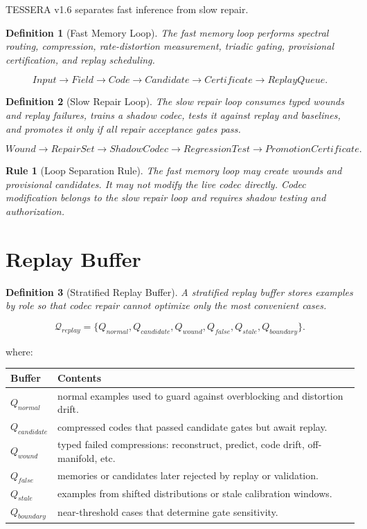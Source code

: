 \documentclass[12pt]{article}
\newtheorem{definition}{Definition}
\newtheorem{rulebox}{Rule}
\begin{document}
TESSERA v1.6 separates fast inference from slow repair.

\begin{definition}[Fast Memory Loop]
The fast memory loop performs spectral routing, compression, rate-distortion
measurement, triadic gating, provisional certification, and replay scheduling.
\end{definition}

\[
Input\rightarrow Field\rightarrow Code\rightarrow Candidate\rightarrow Certificate\rightarrow ReplayQueue.
\]

\begin{definition}[Slow Repair Loop]
The slow repair loop consumes typed wounds and replay failures, trains a shadow
codec, tests it against replay and baselines, and promotes it only if all repair
acceptance gates pass.
\end{definition}

\[
Wound\rightarrow RepairSet\rightarrow ShadowCodec\rightarrow RegressionTest\rightarrow PromotionCertificate.
\]

\begin{rulebox}[Loop Separation Rule]
The fast memory loop may create wounds and provisional candidates. It may not
modify the live codec directly. Codec modification belongs to the slow repair
loop and requires shadow testing and authorization.
\end{rulebox}

\section{Replay Buffer}

\begin{definition}[Stratified Replay Buffer]
A stratified replay buffer stores examples by role so that codec repair cannot
optimize only the most convenient cases.
\end{definition}

\[
\mathcal{Q}_{replay}=\{Q_{normal},Q_{candidate},Q_{wound},Q_{false},Q_{stale},Q_{boundary}\}.
\]

where:

\begin{longtable}{p{}p{}}
\toprule
\textbf{Buffer} & \textbf{Contents} \\
\midrule
$Q_{normal}$ & normal examples used to guard against overblocking and distortion drift. \\
$Q_{candidate}$ & compressed codes that passed candidate gates but await replay. \\
$Q_{wound}$ & typed failed compressions: reconstruct, predict, code drift, off-manifold, etc. \\
$Q_{false}$ & memories or candidates later rejected by replay or validation. \\
$Q_{stale}$ & examples from shifted distributions or stale calibration windows. \\
$Q_{boundary}$ & near-threshold cases that determine gate sensitivity. \\
\bottomrule
\end{longtable}
\end{document}
